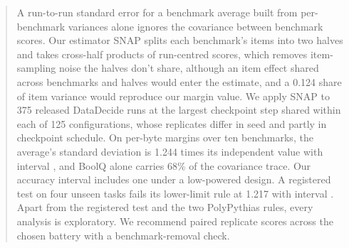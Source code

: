 \begin{abstract}
A run-to-run standard error for a benchmark average built from per-benchmark variances alone ignores the covariance between benchmark scores. Our estimator SNAP splits each benchmark's items into two halves and takes cross-half products of run-centred scores, which removes item-sampling noise the halves don't share, although an item effect shared across benchmarks and halves would enter the estimate, and a 0.124 share of item variance would reproduce our margin value. We apply SNAP to 375 released DataDecide runs at the largest checkpoint step shared within each of 125 configurations, whose replicates differ in seed and partly in checkpoint schedule. On per-byte margins over ten benchmarks, the average's standard deviation is 1.244 times its independent value with interval , and BoolQ alone carries 68\% of the covariance trace. Our accuracy interval  includes one under a low-powered design. A registered test on four unseen tasks fails its lower-limit rule at 1.217 with interval .  Apart from the registered test and the two PolyPythias rules, every analysis is exploratory. We recommend paired replicate scores across the chosen battery with a benchmark-removal check.
\end{abstract}

